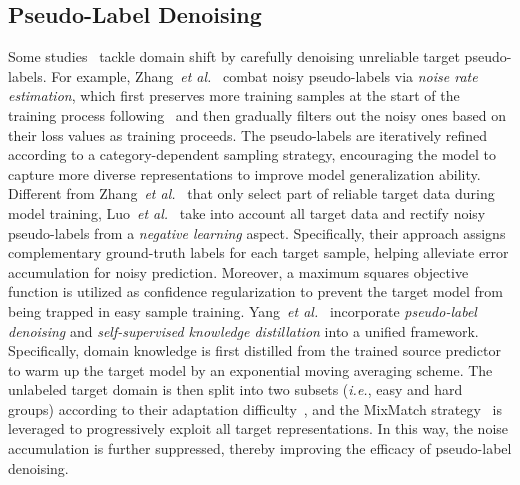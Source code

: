 \documentclass[10pt,journal,compsoc]{IEEEtran}
\def\etal{{\em et al.}}
\def\ie{{\em i.e.}}
\begin{document}
\subsection{Pseudo-Label Denoising}
Some studies~\cite{zhang2021unsupervised, luo2021exploiting} tackle domain shift by carefully denoising unreliable target pseudo-labels. 
For example, Zhang~\etal~\cite{zhang2021unsupervised} combat noisy pseudo-labels via \emph{noise rate estimation}, which first preserves more training samples at the start of the training process following~\cite{arpit2017closer} and then gradually filters out the noisy ones based on their loss values as training proceeds.
The pseudo-labels are iteratively refined according to a category-dependent sampling strategy, encouraging the model to capture more diverse representations to improve model generalization ability.
Different from Zhang~\etal~\cite{zhang2021unsupervised} that only select part of reliable target data during model training, Luo~\etal~\cite{luo2021exploiting} take into account all target data and rectify noisy pseudo-labels from a \emph{negative learning} aspect.
Specifically, their approach assigns complementary ground-truth labels for each target sample, helping alleviate error accumulation for noisy prediction.
Moreover, a maximum squares objective function is utilized as confidence regularization to prevent the target model from being trapped in easy sample training.
Yang~\etal~\cite{yang2022divide} incorporate \emph{pseudo-label denoising} and \emph{self-supervised knowledge distillation} into a unified framework.
Specifically, domain knowledge is first distilled from the trained source predictor to warm up the target model by an exponential moving averaging scheme. 
The unlabeled target domain is then split into two subsets (\ie, easy and hard groups) according to their adaptation difficulty~\cite{arazo2019unsupervised}, and the MixMatch strategy~\cite{berthelot2019mixmatch} is leveraged to progressively exploit all target representations.
In this way, the noise accumulation is further suppressed, thereby improving the efficacy of pseudo-label denoising.
\end{document}
